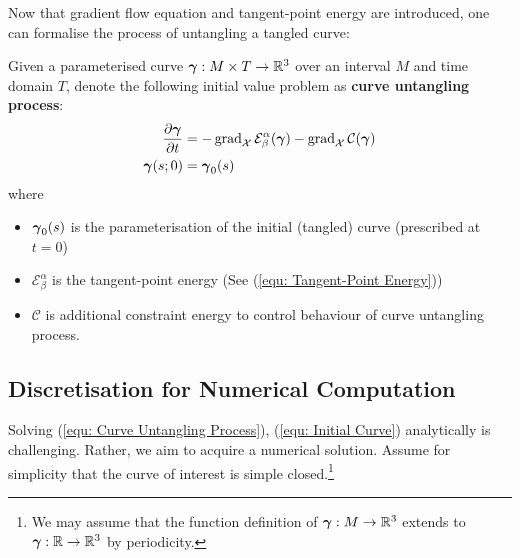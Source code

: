\documentclass[../dissertation.tex]{subfiles}
\begin{document}
Now that gradient flow equation and tangent-point energy are introduced,
one can formalise the process of untangling a tangled curve:

\begin{definition}
    Given a parameterised curve $\boldsymbol{\gamma}:M \times T \rightarrow \mathbb{R}^3$ over an interval $M$ and time domain $T$,
    denote the following initial value problem as \textbf{curve untangling process}:
    \begin{align}
        \frac{\partial \boldsymbol{\gamma}}{\partial t} &= - \operatorname{grad}_{\mathcal{X}} \mathcal{E}_{\beta}^{\alpha} (\boldsymbol{\gamma}) - \operatorname{grad}_{\mathcal{X}} \mathcal{C} (\boldsymbol{\gamma}) 
        \label{equ: Curve Untangling Process}
        \\
        \boldsymbol{\gamma}(s;0) &= \boldsymbol{\gamma}_0 (s)
        \label{equ: Initial Curve}
    \end{align}
    where 
    \begin{itemize}
        \item $\boldsymbol{\gamma}_0 (s)$ is the parameterisation of the initial (tangled) curve (prescribed at $t=0$)
        \item $\mathcal{E}_{\beta}^{\alpha}$ is the tangent-point energy (See (\ref{equ: Tangent-Point Energy}))
        \item $\mathcal{C}$ is additional constraint energy to control behaviour of curve untangling process.
    \end{itemize}
\end{definition}



\subsection{Discretisation for Numerical Computation}
Solving (\ref{equ: Curve Untangling Process}), (\ref{equ: Initial Curve}) analytically is challenging.
Rather, we aim to acquire a numerical solution.
Assume for simplicity that the curve of interest is simple closed.\footnote{
    We may assume that the function definition of $\boldsymbol{\gamma}:M \rightarrow \mathbb{R}^3$ extends to $\boldsymbol{\gamma}: \mathbb{R} \rightarrow \mathbb{R}^3$ by periodicity.
}
\end{document}

